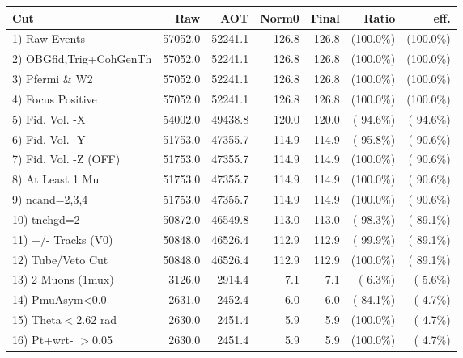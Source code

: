  \begin{table}[h!]\centering
 \begin{tabular}{||l||r|r|r|r|r|r||}
 \hline
 \hline
 Cut & Raw & AOT & Norm0 & Final & Ratio & eff.       \\
 \hline
  1) Raw Events           &      57052.0 &      52241.1 &        126.8 &        126.8 & (100.0\%) & (100.0\%) \\
  2) OBGfid,Trig+CohGenTh &      57052.0 &      52241.1 &        126.8 &        126.8 & (100.0\%) & (100.0\%) \\
  3) Pfermi \& W2         &      57052.0 &      52241.1 &        126.8 &        126.8 & (100.0\%) & (100.0\%) \\
  4) Focus Positive       &      57052.0 &      52241.1 &        126.8 &        126.8 & (100.0\%) & (100.0\%) \\
  5) Fid. Vol. -X         &      54002.0 &      49438.8 &        120.0 &        120.0 & ( 94.6\%) & ( 94.6\%) \\
  6) Fid. Vol. -Y         &      51753.0 &      47355.7 &        114.9 &        114.9 & ( 95.8\%) & ( 90.6\%) \\
  7) Fid. Vol. -Z (OFF)   &      51753.0 &      47355.7 &        114.9 &        114.9 & (100.0\%) & ( 90.6\%) \\
  8) At Least 1 Mu        &      51753.0 &      47355.7 &        114.9 &        114.9 & (100.0\%) & ( 90.6\%) \\
  9) ncand=2,3,4          &      51753.0 &      47355.7 &        114.9 &        114.9 & (100.0\%) & ( 90.6\%) \\
 10) tnchgd=2             &      50872.0 &      46549.8 &        113.0 &        113.0 & ( 98.3\%) & ( 89.1\%) \\
 11) +/- Tracks (V0)      &      50848.0 &      46526.4 &        112.9 &        112.9 & ( 99.9\%) & ( 89.1\%) \\
 12) Tube/Veto Cut        &      50848.0 &      46526.4 &        112.9 &        112.9 & (100.0\%) & ( 89.1\%) \\
 13) 2 Muons (1mux)       &       3126.0 &       2914.4 &          7.1 &          7.1 & (  6.3\%) & (  5.6\%) \\
 14) PmuAsym<0.0          &       2631.0 &       2452.4 &          6.0 &          6.0 & ( 84.1\%) & (  4.7\%) \\
 15) Theta$<$2.62 rad     &       2630.0 &       2451.4 &          5.9 &          5.9 & (100.0\%) & (  4.7\%) \\
 16) Pt+wrt- $>$0.05      &       2630.0 &       2451.4 &          5.9 &          5.9 & (100.0\%) & (  4.7\%) \\

\end{tabular}
\end{table}
